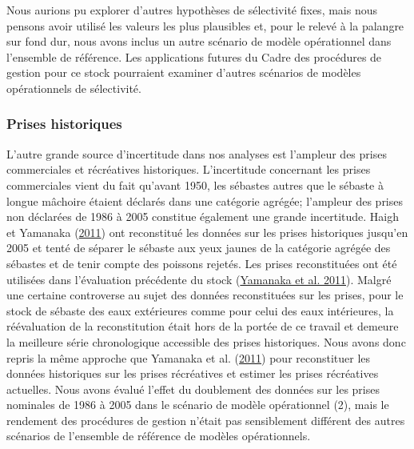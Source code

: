 \documentclass[french,11pt]{book}
\begin{document}
Nous aurions pu explorer d'autres hypothèses de sélectivité fixes, mais nous pensons avoir utilisé les valeurs les plus plausibles et, pour le relevé à la palangre sur fond dur, nous avons inclus un autre scénario de modèle opérationnel dans l'ensemble de référence. Les applications futures du Cadre des procédures de gestion pour ce stock pourraient examiner d'autres scénarios de modèles opérationnels de sélectivité.

\hypertarget{sec:discussion-uncertainties-catch}{%
\subsubsection{Prises historiques}\label{sec:discussion-uncertainties-catch}}

L'autre grande source d'incertitude dans nos analyses est l'ampleur des prises commerciales et récréatives historiques. L'incertitude concernant les prises commerciales vient du fait qu'avant 1950, les sébastes autres que le sébaste à longue mâchoire étaient déclarés dans une catégorie agrégée; l'ampleur des prises non déclarées de 1986 à 2005 constitue également une grande incertitude. Haigh et Yamanaka (\protect\hyperlink{ref-haigh2011}{2011}) ont reconstitué les données sur les prises historiques jusqu'en 2005 et tenté de séparer le sébaste aux yeux jaunes de la catégorie agrégée des sébastes et de tenir compte des poissons rejetés. Les prises reconstituées ont été utilisées dans l'évaluation précédente du stock (\protect\hyperlink{ref-yamanaka2011}{Yamanaka et al. 2011}). Malgré une certaine controverse au sujet des données reconstituées sur les prises, pour le stock de sébaste des eaux extérieures comme pour celui des eaux intérieures, la réévaluation de la reconstitution était hors de la portée de ce travail et demeure la meilleure série chronologique accessible des prises historiques. Nous avons donc repris la même approche que Yamanaka et al. (\protect\hyperlink{ref-yamanaka2011}{2011}) pour reconstituer les données historiques sur les prises récréatives et estimer les prises récréatives actuelles. Nous avons évalué l'effet du doublement des données sur les prises nominales de 1986 à 2005 dans le scénario de modèle opérationnel (2), mais le rendement des procédures de gestion n'était pas sensiblement différent des autres scénarios de l'ensemble de référence de modèles opérationnels.
\end{document}
